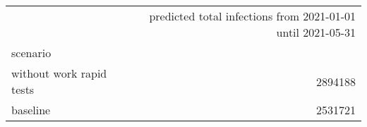 \begin{tabular}{lr}
\toprule
{} &  predicted total infections from 2021-01-01 until 2021-05-31 \\
scenario                  &                                                              \\
\midrule
 without work rapid tests &                                            2894188 \\
 baseline                 &                                            2531721 \\
\bottomrule
\end{tabular}
